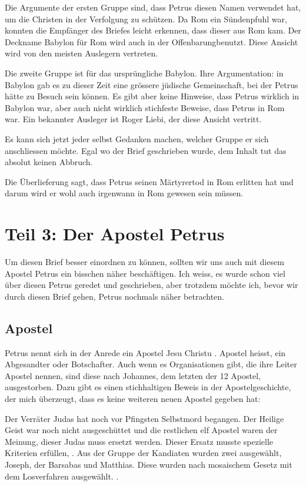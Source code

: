 \documentclass[fontsize=16pt]{mybib}
\begin{document}
Die Argumente der ersten Gruppe sind, dass Petrus diesen Namen verwendet hat, um die Christen in der Verfolgung zu schützen. Da Rom ein Sündenpfuhl war, konnten die Empfänger des Briefes leicht erkennen, dass dieser aus Rom kam. Der Deckname Babylon für Rom wird auch in der Offenbarungbenutzt. Diese Ansicht wird von den meisten Auslegern vertreten.

Die zweite Gruppe ist für das ursprüngliche Babylon. Ihre Argumentation: in Babylon gab es zu dieser Zeit eine grössere jüdische Gemeinschaft, bei der Petrus hätte zu Besuch sein können. Es gibt aber keine Hinweise, dass Petrus wirklich in Babylon war, aber auch nicht wirklich stichfeste Beweise, dass Petrus in Rom war. Ein bekannter Ausleger ist \zB{} Roger Liebi, der diese Ansicht vertritt.

Es kann sich jetzt jeder selbst Gedanken machen, welcher Gruppe er sich anschliessen möchte. Egal wo der Brief geschrieben wurde, dem Inhalt tut das absolut keinen Abbruch.

Die Überlieferung sagt, dass Petrus seinen Märtyrertod in Rom erlitten hat und darum wird er wohl auch irgenwann in Rom gewesen sein müssen.


\section{Teil 3: Der Apostel Petrus}
Um diesen Brief besser einordnen zu können, sollten wir uns auch mit diesem Apostel Petrus ein bisschen näher beschäftigen. Ich weiss, es wurde schon viel über diesen Petrus geredet und geschrieben, aber trotzdem möchte ich, bevor wir durch diesen Brief gehen, Petrus nochmals näher betrachten.

\subsection{Apostel}
Petrus nennt sich in der Anrede ein Apostel Jesu Christu . Apostel heisst, ein Abgesandter oder Botschafter. Auch wenn es Organisationen gibt, die ihre Leiter Apostel nennen, sind diese nach Johannes, dem letzten der 12 Apostel, ausgestorben. Dazu gibt es einen stichhaltigen Beweis in der Apostelgeschichte, der mich überzeugt, dass es keine weiteren neuen Apostel gegeben hat: 

Der Verräter Judas hat noch vor Pfingsten Selbstmord begangen. Der Heilige Geist war noch nicht ausgeschüttet und die restlichen elf Apostel waren der Meinung, dieser Judas muss ersetzt werden. Dieser Ersatz musste spezielle Kriterien erfüllen, . Aus der Gruppe der Kandiaten wurden zwei ausgewählt, Joseph, der Barsabas und Matthias. Diese wurden nach mosaischem Gesetz mit dem Losverfahren ausgewählt. .
\end{document}
